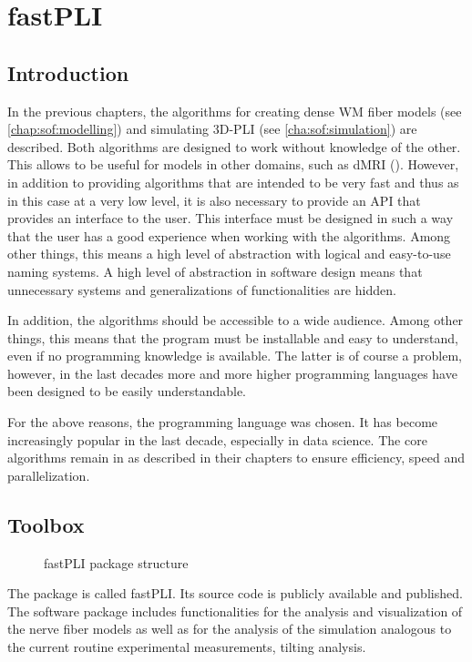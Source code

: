 \setcounter{chapter}{5}
\chapter{\acs{fastPLI}}
\label{chap:Software}
% 
% 
% 
\section{Introduction}\label{sec:fastpliIntro}
%
In the previous chapters, the algorithms for creating dense \ac{WM} fiber models (see \cref{chap:sof:modelling}) and simulating \ac{3D-PLI} (see \cref{cha:sof:simulation}) are described.
Both algorithms are designed to work without knowledge of the other.
This allows \eg{} to be useful for models in other domains, such as \ac{dMRI} (\cite{Ginsburger2019,ginsburgerDis2019}).
However, in addition to providing algorithms that are intended to be very fast and thus as in this case at a very low level, it is also necessary to provide an \ac{API} that provides an interface to the user.
This interface must be designed in such a way that the user has a good experience when working with the algorithms.
Among other things, this means a high level of abstraction with logical and easy-to-use naming systems.
A high level of abstraction in software design means that unnecessary systems and generalizations of functionalities are hidden.
%
\par
%
In addition, the algorithms should be accessible to a wide audience.
Among other things, this means that the program must be installable and easy to understand, even if no programming knowledge is available.
The latter is of course a problem, however, in the last decades more and more higher programming languages have been designed to be easily understandable.
%
\par
%
For the above reasons, the \python{} programming language was chosen.
It has become increasingly popular in the last decade, especially in data science.
The core algorithms remain in \cpp{} as described in their chapters to ensure efficiency, speed and parallelization.
%
\section{Toolbox}
%
\begin{figure}[!ht]
\centering
\caption[\acs{fastPLI}]{\ac{fastPLI} package structure}
\label{fig:fastpli}
\end{figure}
%
The \python{} package is called \ac{fastPLI}.
Its source code is publicly available and \cite{fastpli,Matuschke2021} published.
The software package includes functionalities for the analysis and visualization of the nerve fiber models as well as for the analysis of the simulation analogous to the current routine experimental measurements, \eg{} tilting analysis.
%
%
%
